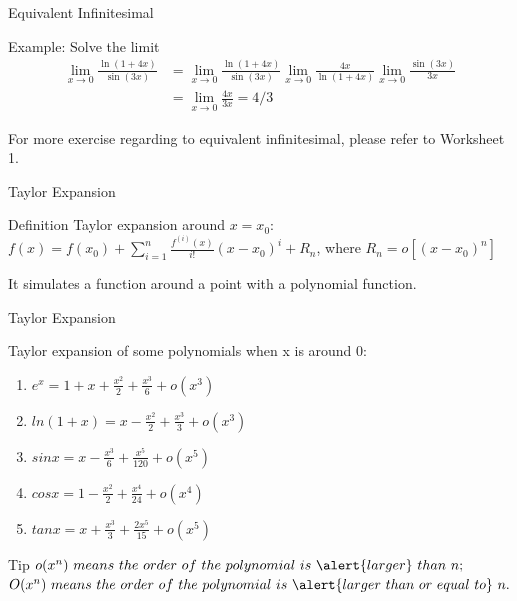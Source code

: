 \begin{frame}{Equivalent Infinitesimal}
    \begin{block}{Example: Solve the limit}
        $$
            \begin{aligned}
                \lim _{x \rightarrow 0} \frac{\ln (1+4 x)}{\sin (3 x)} & =\lim _{x \rightarrow 0} \frac{\ln (1+4 x)}{\sin (3 x)} \lim _{x \rightarrow 0} \frac{4 x}{\ln (1+4 x)} \lim _{x \rightarrow 0} \frac{\sin (3 x)}{3 x} \\&=\lim _{x \rightarrow 0} \frac{4 x}{3 x}=4 / 3
            \end{aligned}
        $$
    \end{block}
    For more exercise regarding to equivalent infinitesimal, please refer to Worksheet 1.
\end{frame}



\begin{frame}{Taylor Expansion}
    \begin{block}{Definition}
        Taylor expansion around $x=x_0$:\\
        $f(x)=f(x_0)+\sum\limits_{i=1}^n\frac{f^{(i)}(x)}{i!}(x-x_0)^i+R_n$, where $R_n=o[(x-x_0)^n]$\\
    \end{block}

    It simulates a function around a point with a polynomial function.
\end{frame}



\begin{frame}{Taylor Expansion}

    Taylor expansion of some polynomials when x is around 0:
    \begin{enumerate}
        \item $e^x=1+x+\frac{x^2}{2}+\frac{x^3}{6}+o(x^3)$
        \item $ln(1+x)=x-\frac{x^2}{2}+\frac{x^3}{3}+o(x^3)$
        \item $sinx=x-\frac{x^3}{6}+\frac{x^5}{120}+o(x^5)$
        \item $cosx=1-\frac{x^2}{2}+\frac{x^4}{24}+o(x^4)$
        \item $tanx=x+\frac{x^3}{3}+\frac{2x^5}{15}+o(x^5)$
    \end{enumerate}
    \begin{block}{Tip}
        \footnotesize
        $o(x^n)\ means\ the\ order\ of\ the\ polynomial\ is\ \alert{larger}\ than\ n;$\\
        $O(x^n)\ means\ the\ order\ of\ the\ polynomial\ is\ \alert{larger\ than\ or\ equal\ to}\ n.$
        \normalsize
    \end{block}
\end{frame}


